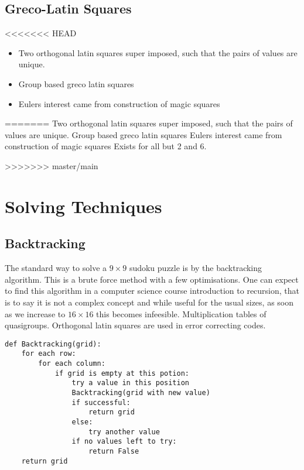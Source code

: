 \documentclass[a4paper,12pt]{article}
\begin{document}
	\subsection{Greco-Latin Squares}

<<<<<<< HEAD
		\begin{itemize}
		\item{Two orthogonal latin squares super imposed, such that the pairs of values are unique.}
		\item{Group based greco latin squares}
		\item{Eulers interest came from construction of magic squares}
		\end{itemize}

=======
		Two orthogonal latin squares super imposed, such that the pairs of values are unique.
		Group based greco latin squares
		Eulers interest came from construction of magic squares
		Exists for all but 2 and 6.
		
>>>>>>> master/main
\section{Solving Techniques}
	\subsection{Backtracking}
		
		The standard way to solve a $9 \times 9$ sudoku puzzle is by the backtracking algorithm. 
		This is a brute force method with a few optimisations.
		One can expect to find this algorithm in a computer science course introduction to recursion, that is to say it is not a complex concept 
		and while useful for the usual sizes, as soon as we increase to $16 \times 16$ this becomes infeesible.
		Multiplication tables of quasigroups.
		Orthogonal latin squares are used in error correcting codes.
		
		\begin{lstlisting}[caption=Backtracking]
def Backtracking(grid):
    for each row:
        for each column:
            if grid is empty at this potion:
                try a value in this position
                Backtracking(grid with new value)
                if successful:
                    return grid
                else:
                    try another value
                if no values left to try:
                    return False
    return grid						
		\end{lstlisting}
		
\end{document}
